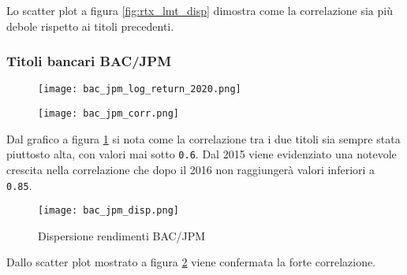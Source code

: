 Lo scatter plot a figura \ref{fig:rtx_lmt_disp} dimostra come la correlazione sia più debole rispetto ai titoli precedenti.

\pagebreak

\subsubsection{Titoli bancari BAC/JPM}

\begin{figure}[h]
  \centering
  \begin{minipage}{.4\textwidth}
    \centering
    \texttt{[image: bac\_jpm\_log\_return\_2020.png]}
    \label{fig:bac_jpm_log_return_2020}
  \end{minipage}%
  \begin{minipage}{.6\textwidth}
    \centering
    \texttt{[image: bac\_jpm\_corr.png]}
    \label{fig:bac_jpm_corr}
  \end{minipage}
\end{figure}

Dal grafico a figura \ref{fig:bac_jpm_corr} si nota come la correlazione tra i due titoli sia sempre stata piuttosto alta, con valori mai sotto \verb|0.6|.
Dal 2015 viene evidenziato una notevole crescita nella correlazione che dopo il 2016 non raggiungerà valori inferiori a \verb|0.85|.

\begin{figure}[h]
  \centering
  \texttt{[image: bac\_jpm\_disp.png]}
  \caption{Dispersione rendimenti BAC/JPM}
  \label{fig:bac_jpm_disp}
\end{figure}

Dallo scatter plot mostrato a figura \ref{fig:bac_jpm_disp} viene confermata la forte correlazione.

\pagebreak